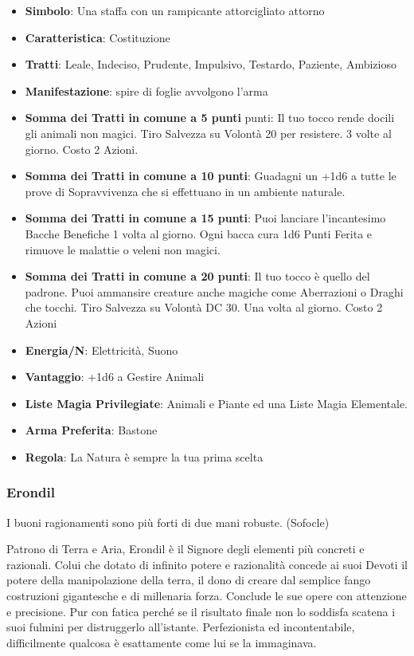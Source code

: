 \begin{multicols}{2}
\begin{itemize}[leftmargin=*] \setlength{\itemsep}{0pt}
\item \textbf{Simbolo}: Una staffa con un rampicante attorcigliato attorno
\item \textbf{Caratteristica}: Costituzione
\item \textbf{Tratti}: Leale, Indeciso, Prudente, Impulsivo, Testardo, Paziente, Ambizioso
\item \textbf{Manifestazione}: spire di foglie avvolgono l'arma
\item \textbf{Somma dei Tratti in comune a 5 punti} punti: Il tuo tocco rende docili gli animali non magici. Tiro Salvezza su Volontà 20 per resistere. 3 volte al giorno. Costo 2 Azioni.
\item \textbf{Somma dei Tratti in comune a 10 punti}: Guadagni un +1d6 a tutte le prove di Sopravvivenza che si effettuano in un ambiente naturale.
\item \textbf{Somma dei Tratti in comune a 15 punti}: Puoi lanciare l'incantesimo Bacche Benefiche 1 volta al giorno. Ogni bacca cura 1d6 Punti Ferita e rimuove le malattie o veleni non magici.
\item \textbf{Somma dei Tratti in comune a 20 punti}: Il tuo tocco è quello del padrone. Puoi ammansire creature anche magiche come Aberrazioni o Draghi che tocchi. Tiro Salvezza su Volontà DC 30. Una volta al giorno. Costo 2 Azioni
\item \textbf{Energia/N}: Elettricità, Suono
\item \textbf{Vantaggio}: +1d6 a Gestire Animali
\item \textbf{Liste Magia Privilegiate}: Animali e Piante ed una Liste Magia Elementale.
\item \textbf{Arma Preferita}: Bastone
\item \textbf{Regola}: La Natura è sempre la tua prima scelta
\end{itemize}

\subsubsection{Erondil}\label{erondil}\hypertarget{erondil}{}

\begin{enfasi}{
I buoni ragionamenti sono più forti di due mani robuste. (Sofocle)
}\end{enfasi}

Patrono di Terra e Aria, Erondil è il Signore degli elementi più concreti e razionali. Colui che dotato di infinito potere e razionalità concede ai suoi Devoti il potere della manipolazione della terra, il dono di creare dal semplice fango costruzioni gigantesche e di millenaria forza. Conclude le sue opere con attenzione e precisione.
Pur con fatica perché se il risultato finale non lo soddisfa scatena i suoi fulmini per distruggerlo all'istante. Perfezionista ed incontentabile, difficilmente qualcosa è esattamente come lui se la immaginava.


\end{multicols}
